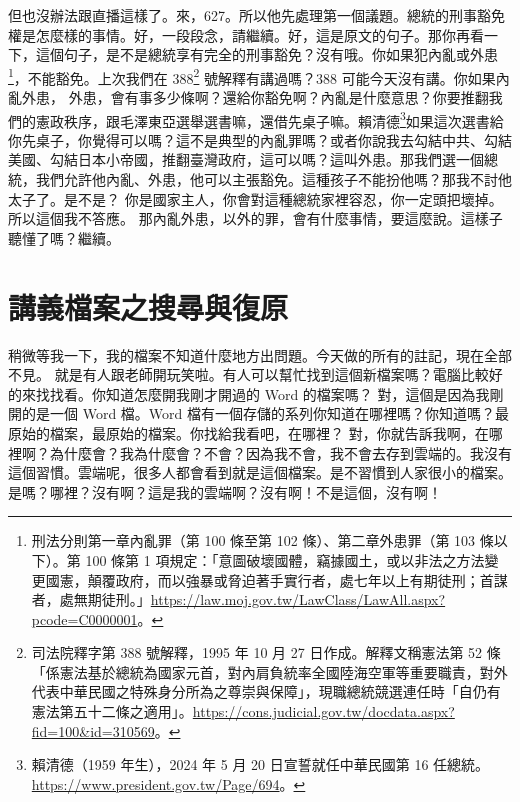 \hypertarget{c11:cue:42}{}但也沒辦法跟直播這樣了。來，627。所以他先處理第一個議題。總統的刑事豁免權是怎麼樣的事情。好，一段段念，請繼續。好，這是原文的句子。那你再看一下，這個句子，是不是總統享有完全的刑事豁免？沒有哦。你如果犯內亂或外患\footnote{刑法分則第一章內亂罪（第 100 條至第 102 條）、第二章外患罪（第 103 條以下）。第 100 條第 1 項規定：「意圖破壞國體，竊據國土，或以非法之方法變更國憲，顛覆政府，而以強暴或脅迫著手實行者，處七年以上有期徒刑；首謀者，處無期徒刑。」\url{https://law.moj.gov.tw/LawClass/LawAll.aspx?pcode=C0000001}。}，不能豁免。上次我們在 388\footnote{司法院釋字第 388 號解釋，1995 年 10 月 27 日作成。解釋文稱憲法第 52 條「係憲法基於總統為國家元首，對內肩負統率全國陸海空軍等重要職責，對外代表中華民國之特殊身分所為之尊崇與保障」，現職總統競選連任時「自仍有憲法第五十二條之適用」。\url{https://cons.judicial.gov.tw/docdata.aspx?fid=100&id=310569}。} 號解釋有講過嗎？388 可能今天沒有講。你如果內亂外患，
\hypertarget{c11:cue:43}{}外患，會有事多少條啊？還給你豁免啊？內亂是什麼意思？你要推翻我們的憲政秩序，跟毛澤東亞選舉選書嘛，還借先桌子嘛。賴清德\footnote{賴清德（1959 年生），2024 年 5 月 20 日宣誓就任中華民國第 16 任總統。\url{https://www.president.gov.tw/Page/694}。}如果這次選書給你先桌子，你覺得可以嗎？這不是典型的內亂罪嗎？或者你說我去勾結中共、勾結美國、勾結日本小帝國，推翻臺灣政府，這可以嗎？這叫外患。那我們選一個總統，我們允許他內亂、外患，他可以主張豁免。這種孩子不能扮他嗎？那我不討他太子了。是不是？
\hypertarget{c11:cue:44}{}你是國家主人，你會對這種總統家裡容忍，你一定頭把壞掉。所以這個我不答應。
\hypertarget{c11:cue:45}{}那內亂外患，以外的罪，會有什麼事情，要這麼說。這樣子聽懂了嗎？繼續。

\section{講義檔案之搜尋與復原}

\hypertarget{c11:cue:46}{}稍微等我一下，我的檔案不知道什麼地方出問題。今天做的所有的註記，現在全部不見。
\hypertarget{c11:cue:47}{}就是有人跟老師開玩笑啦。有人可以幫忙找到這個新檔案嗎？電腦比較好的來找找看。你知道怎麼開我剛才開過的 Word 的檔案嗎？
\hypertarget{c11:cue:48}{}對，這個是因為我剛開的是一個 Word 檔。Word 檔有一個存儲的系列你知道在哪裡嗎？你知道嗎？最原始的檔案，最原始的檔案。你找給我看吧，在哪裡？
\hypertarget{c11:cue:49}{}對，你就告訴我啊，在哪裡啊？為什麼會？我為什麼會？不會？因為我不會，我不會去存到雲端的。我沒有這個習慣。雲端呢，很多人都會看到就是這個檔案。是不習慣到人家很小的檔案。是嗎？哪裡？沒有啊？這是我的雲端啊？沒有啊！不是這個，沒有啊！

